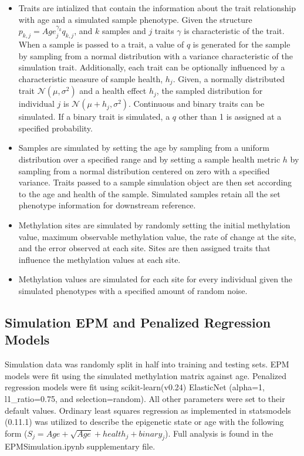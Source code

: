 \documentclass{article}
\begin{document}
{\begin{linenumbers}
\begin{itemize}
    \item{Traits are intialized that contain the information about the trait relationship with age and a 
    simulated sample phenotype. Given the structure $p_{k,j} = Age_j^{\gamma_{k}} q_{k,j}$, and $k$ samples 
    and $j$ traits $\gamma$ is characteristic of the trait. When a sample is passed to a trait, a value of $q$ is
    generated for the sample by sampling from a normal distribution with a variance characteristic of the 
    simulation trait. Additionally, each trait can be optionally influenced by a characteristic measure of sample 
    health, $h_j$. Given, a normally distributed trait $\mathcal{N}(\mu,\sigma^{2})$ and a health effect $h_j$, 
    the sampled distribution for individual $j$ is $\mathcal{N}(\mu + h_j,\sigma^{2})$. Continuous and binary 
    traits can be simulated. If a binary trait is simulated, a $q$ other than 1 is assigned at a 
    specified probability.}
     
    \item{Samples are simulated by setting the age by sampling from a uniform distribution over a specified range 
    and by setting a sample health metric $h$ by sampling from a normal distribution centered on zero with a 
    specified variance. Traits passed to a sample simulation object are then set according to the age and 
    health of the sample. Simulated samples retain all the set phenotype information for downstream reference.}

    \item{Methylation sites are simulated by randomly setting the initial methylation value, maximum observable 
    methylation value, the rate of change at the site, and the error observed at each site. Sites are then assigned 
    traits that influence the methylation values at each site.}

    \item{Methylation values are simulated for each site for every individual given the simulated phenotypes with a 
    specified amount of random noise.}
\end{itemize}

\subsection{Simulation EPM and Penalized Regression Models}

Simulation data was randomly split in half into training and testing sets. EPM models were fit using the 
simulated methylation matrix against age. Penalized regression models were fit 
using scikit-learn(v0.24)\cite{Pedregosa2011-fi} ElasticNet (alpha=1, l1\_ratio=0.75, and selection=random). 
All other parameters were set to their default values. Ordinary least squares regression as implemented in 
statsmodels (0.11.1)\cite{Seabold2010-lt} was utilized to describe the epigenetic state or age with the following 
form ($S_j  = Age + \sqrt{Age} + health_j + binary_j$). Full analysis is found in the 
EPMSimulation.ipynb supplementary file.  


\end{linenumbers}}
\end{document}
